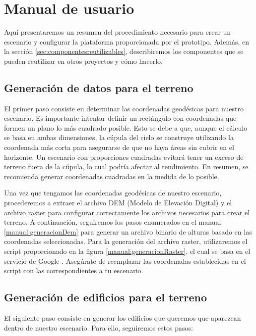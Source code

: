 \documentclass[a4paper, 11pt]{book}
\begin{document}
\clearpage
\chapter{Manual de usuario}
Aquí presentaremos un resumen del procedimiento necesario para crear un escenario y configurar la plataforma proporcionada por el prototipo. Además, en la sección \ref{sec:componentesreutilizables}, describiremos los componentes que se pueden reutilizar en otros proyectos y cómo hacerlo.

\section{Generación de datos para el terreno}
El primer paso consiste en determinar las coordenadas geodésicas para nuestro escenario. Es importante intentar definir un rectángulo con coordenadas que formen un plano lo más cuadrado posible. Esto se debe a que, aunque el cálculo se basa en ambas dimensiones, la cúpula del cielo se construye utilizando la coordenada más corta para asegurarse de que no haya áreas sin cubrir en el horizonte. Un escenario con proporciones cuadradas evitará tener un exceso de terreno fuera de la cúpula, lo cual podría afectar al rendimiento. En resumen, se recomienda generar coordenadas cuadradas en la medida de lo posible.

Una vez que tengamos las coordenadas geodésicas de nuestro escenario, procederemos a extraer el archivo DEM (Modelo de Elevación Digital) y el archivo raster para configurar correctamente los archivos necesarios para crear el terreno. A continuación, seguiremos los pasos enumerados en el manual \ref{manual:generacionDem} para generar un archivo binario de alturas basado en las coordenadas seleccionadas. Para la generación del archivo raster, utilizaremos el script proporcionado en la figura \ref{manual:generacionRaster}, el cual se basa en el servicio de Google \cite{googleearthengine}. Asegúrate de reemplazar las coordenadas establecidas en el script con las correspondientes a tu escenario.

\section{Generación de edificios para el terreno}
El siguiente paso consiste en generar los edificios que queremos que aparezcan dentro de nuestro escenario. Para ello, seguiremos estos pasos:
\end{document}
